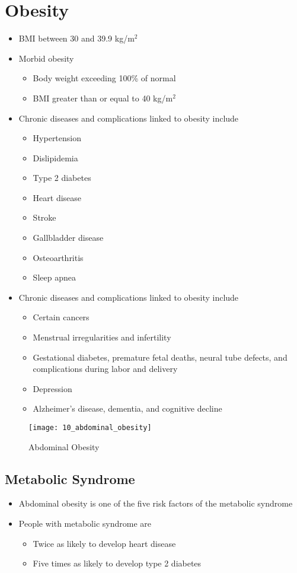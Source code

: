 \documentclass[title={Chapter 10: Achieving and Maintaining a Healthful Body Weight}]{fdsn201notes}
\begin{document}
\section{Obesity}\label{sec:obesity}
\begin{itemize}
	\item BMI between 30 and 39.9 kg/$\mbox{m}^{2}$
	\item Morbid obesity
	\begin{itemize}
		\item Body weight exceeding 100\% of normal
		\item BMI greater than or equal to 40 kg/$\mbox{m}^{2}$
	\end{itemize}
	\item Chronic diseases and complications linked to obesity include
	\begin{itemize}
		\item Hypertension
		\item Dislipidemia
		\item Type 2 diabetes
		\item Heart disease
		\item Stroke
		\item Gallbladder disease
		\item Osteoarthritis
		\item Sleep apnea
	\end{itemize}
	\item Chronic diseases and complications linked to obesity include
	\begin{itemize}
		\item Certain cancers
		\item Menstrual irregularities and infertility
		\item Gestational diabetes, premature fetal deaths, neural tube defects, and complications during labor and delivery
		\item Depression
		\item Alzheimer’s disease, dementia, and cognitive decline
	\end{itemize}
\end{itemize}

\begin{figure}[H]
	\centering
	\texttt{[image: 10\_abdominal\_obesity]}
	\caption{Abdominal Obesity}
	\label{fig:abdominal-obesity}
\end{figure}

\subsection{Metabolic Syndrome}\label{subsec:metabolic-syndrome}
\begin{itemize}
	\item Abdominal obesity is one of the five risk factors of the metabolic syndrome
	\item People with metabolic syndrome are
	\begin{itemize}
		\item Twice as likely to develop heart disease
		\item Five times as likely to develop type 2 diabetes
	\end{itemize}
\end{itemize}
\end{document}
